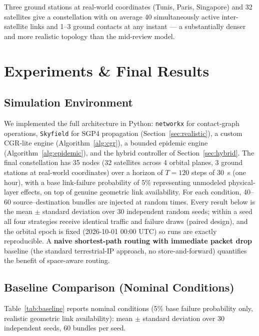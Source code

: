\documentclass[10pt,twocolumn]{article}
\begin{document}
Three ground stations at real-world coordinates (Tunis, Paris, Singapore) and 32 satellites give a constellation with on average 40 simultaneously active inter-satellite links and 1--3 ground contacts at any instant --- a substantially denser and more realistic topology than the mid-review model.

\section{Experiments \& Final Results}
\label{sec:results}

\subsection{Simulation Environment}
We implemented the full architecture in Python: \texttt{networkx} for contact-graph operations, \texttt{Skyfield} for SGP4 propagation (Section~\ref{sec:realistic}), a custom CGR-lite engine (Algorithm~\ref{alg:cgr}), a bounded epidemic engine (Algorithm~\ref{alg:epidemic}), and the hybrid controller of Section~\ref{sec:hybrid}. The final constellation has 35 nodes (32 satellites across 4 orbital planes, 3 ground stations at real-world coordinates) over a horizon of $T=120$ steps of 30~s (one hour), with a base link-failure probability of 5\% representing unmodeled physical-layer effects, on top of genuine geometric link availability. For each condition, 40--60 source--destination bundles are injected at random times. Every result below is the mean $\pm$ standard deviation over 30 independent random seeds; within a seed all four strategies receive identical traffic and failure draws (paired design), and the orbital epoch is fixed (2026-10-01 00:00 UTC) so runs are exactly reproducible. A \textbf{naive shortest-path routing with immediate packet drop} baseline (the standard terrestrial-IP approach, no store-and-forward) quantifies the benefit of space-aware routing.

\subsection{Baseline Comparison (Nominal Conditions)}
Table~\ref{tab:baseline} reports nominal conditions (5\% base failure probability only, realistic geometric link availability): mean $\pm$ standard deviation over 30 independent seeds, 60 bundles per seed.
\end{document}
